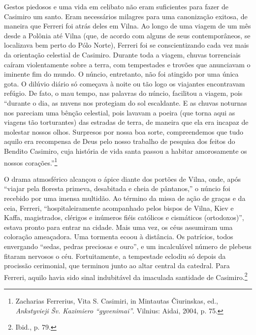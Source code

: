 Gestos piedosos e uma vida em celibato não eram suficientes para fazer
de Casimiro um santo. Eram necessários milagres para uma canonização
exitosa, de maneira que Ferreri foi atrás deles em Vilna. Ao longo de
uma viagem de um mês desde a Polônia até Vilna (que, de acordo com
alguns de seus contemporâneos, se localizava bem perto do Pólo Norte),
Ferreri foi se conscientizando cada vez mais da orientação celestial de
Casimiro. Durante toda a viagem, chuvas torrenciais caíram violentamente
sobre a terra, com tempestades e trovões que anunciavam o iminente fim
do mundo. O núncio, entretanto, não foi atingido por uma única gota. O
dilúvio diário só começava à noite ou tão logo os viajantes encontravam
refúgio. De fato, o mau tempo, nas palavras do núncio, facilitou a
viagem, pois ``durante o dia, as nuvens nos protegiam do sol escaldante.
E as chuvas noturnas nos pareciam uma bênção celestial, pois lavavam a
poeira (que torna aqui as viagens tão torturantes) das estradas de
terra, de maneira que ela era incapaz de molestar nossos olhos.
Surpresos por nossa boa sorte, compreendemos que tudo aquilo era
recompensa de Deus pelo nosso trabalho de pesquisa dos feitos do Bendito
Casimiro, cuja história de vida santa passou a habitar amorosamente os
nossos corações.''\footnote{Zacharias Ferrerius, Vita S. Casimiri, in
  Mintautas Čiurinskas, ed., \emph{Ankstyvieji Šv. Kazimiero
  ``gyvenimai''}. Vilnius: Aidai, 2004, p. 75.}

O drama atmosférico alcançou o ápice diante dos portões de Vilna, onde,
após ``viajar pela floresta primeva, desabitada e cheia de pântanos,'' o
núncio foi recebido por uma imensa multidão. Ao término da missa de ação
de graças e da ceia, Ferreri, ``hospitaleiramente acompanhado pelos
bispos de Vilna, Kiev e Kaffa, magistrados, clérigos e inúmeros fiéis
católicos e cismáticos (ortodoxos)'', estava pronto para entrar na
cidade. Mais uma vez, os céus assumiram uma coloração ameaçadora. Uma
tormenta ecoou à distância. Os patrícios, todos envergando ``sedas,
pedras preciosas e ouro'', e um incalculável número de plebeus fitaram
nervosos o céu. Fortuitamente, a tempestade eclodiu só depois da
procissão cerimonial, que terminou junto ao altar central da catedral.
Para Ferreri, aquilo havia sido sinal indubitável da imaculada santidade
de Casimiro.\footnote{Ibid., p. 79.}

